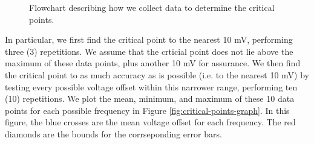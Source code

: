 \begin{figure}[!htb]
    \caption{
        \label{fig:data-collection-flowchart}
        Flowchart describing how we collect data to determine the critical
        points.
    }
\end{figure}

In particular, we first find the critical point to the nearest 10 mV, performing
three (3) repetitions. We assume that the crticial point does not lie above the
maximum of these data points, plus another 10 mV for assurance. We then find the
critical point to as much accuracy as is possible (i.e. to the nearest 10 mV)
by testing every possible voltage offset within this narrower range, performing
ten (10) repetitions. We plot the mean, minimum, and maximum of these 10 data
points for each possible frequency in Figure \ref{fig:critical-points-graph}.
In this figure, the blue crosses are the mean voltage offset for each frequency.
The red diamonds are the bounds for the corrseponding error bars.

